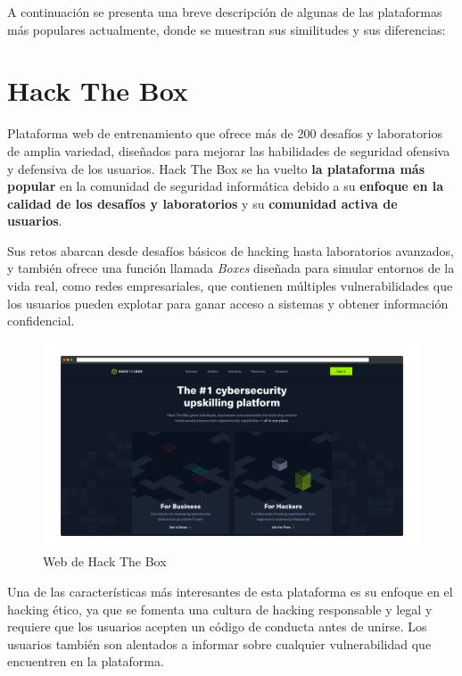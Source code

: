     A continuación se presenta una breve descripción de algunas de las plataformas más populares actualmente, donde se muestran sus similitudes y sus diferencias:
    
    \newpage
    
    
    \section{Hack The Box}
    
        Plataforma web de entrenamiento que ofrece más de 200 desafíos y laboratorios de amplia variedad, diseñados para mejorar las habilidades de seguridad ofensiva y defensiva de los usuarios. Hack The Box se ha vuelto \textbf{la plataforma más popular} en la comunidad de seguridad informática debido a su \textbf{enfoque en la calidad de los desafíos y laboratorios} y su \textbf{comunidad activa de usuarios}.
        
        Sus retos abarcan desde desafíos básicos de hacking hasta laboratorios avanzados, y también ofrece una función llamada \textit{Boxes} diseñada para simular entornos de la vida real, como redes empresariales, que contienen múltiples vulnerabilidades que los usuarios pueden explotar para ganar acceso a sistemas y obtener información confidencial.
        
        \begin{figure}[h]
            \centering

            \includegraphics[width=\textwidth]{images/Capturas/Web de HTB.png}

            \caption{Web de Hack The Box}
            \label{fig:HTB-web}
        \end{figure}
        
        Una de las características más interesantes de esta plataforma es su enfoque en el hacking ético, ya que se fomenta una cultura de hacking responsable y legal y requiere que los usuarios acepten un código de conducta antes de unirse. Los usuarios también son alentados a informar sobre cualquier vulnerabilidad que encuentren en la plataforma.
        
